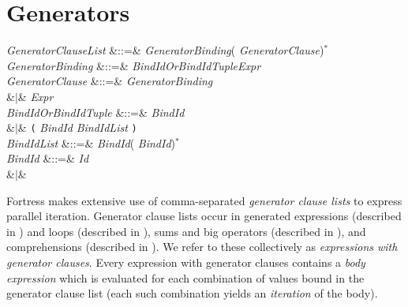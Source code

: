%
%
%
%

\section{Generators}


\begin{Grammar}
\emph{GeneratorClauseList} &::=& \emph{GeneratorBinding}(\EXP{,} \emph{GeneratorClause})$^*$ \\

\emph{GeneratorBinding}
&::=& \emph{BindIdOrBindIdTuple}\EXP{\leftarrow}\emph{Expr} \\

\emph{GeneratorClause}
&::=& \emph{GeneratorBinding} \\
&$|$& \emph{Expr} \\

\emph{BindIdOrBindIdTuple}
&::=& \emph{BindId}\\
&$|$& \texttt{(} \emph{BindId}\EXP{,} \emph{BindIdList} \texttt{)}\\

\emph{BindIdList} &::=& \emph{BindId}(\EXP{,} \emph{BindId})$^*$\\

\emph{BindId} &::=& \emph{Id}\\
&$|$& \KWD{\_}\\
\end{Grammar}

Fortress makes extensive use of comma-separated \emph{generator clause lists}
to express parallel iteration.  Generator clause lists occur in
generated expressions (described in ) and
 loops (described in ),
sums and big operators (described in ),
and comprehensions (described in ).
We refer to these
collectively as \emph{expressions with generator clauses}.  Every expression with
generator clauses contains a \emph{body expression} which is evaluated for each
combination of values bound in the generator clause list
(each such combination yields an \emph{iteration} of the body).

